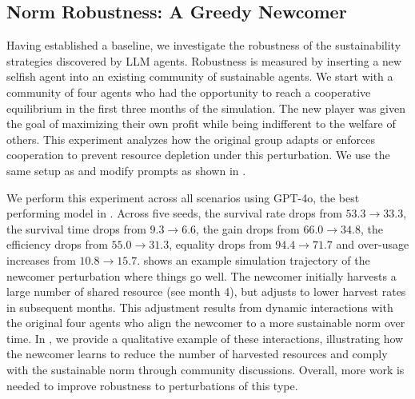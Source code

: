 \documentclass{article}
\begin{document}
\subsection{Norm Robustness: A Greedy Newcomer}
\label{p:newcomer}
Having established a baseline, we investigate the robustness of the sustainability strategies discovered by LLM agents. Robustness is measured by inserting a new selfish agent into an existing community of sustainable agents. We start with a community of four agents who had the opportunity to reach a cooperative equilibrium in the first three months of the simulation. The new player was given the goal of maximizing their own profit while being indifferent to the welfare of others. This experiment analyzes how the original group adapts or enforces cooperation to prevent resource depletion under this perturbation. We use the same setup as  and modify prompts as shown in .

We perform this experiment across all scenarios using GPT-4o, the best performing model in . Across five seeds, the survival rate drops from $53.3 \rightarrow 33.3$, the survival time drops from $9.3 \rightarrow 6.6$, the gain drops from $66.0 \rightarrow 34.8$, the efficiency drops from $55.0 \rightarrow 31.3$, equality drops from $94.4 \rightarrow 71.7$ and over-usage increases from $10.8 \rightarrow 15.7$.  shows an example simulation trajectory of the newcomer perturbation where things go well. The newcomer initially harvests a large number of shared resource (see month 4), but adjusts to lower harvest rates in subsequent months. This adjustment results from dynamic interactions with the original four agents who align the newcomer to a more sustainable norm over time. In , we provide a qualitative example of these interactions, illustrating how the newcomer learns to reduce the number of harvested resources and comply with the sustainable norm through community discussions. Overall, more work is needed to improve robustness to perturbations of this type. 
\end{document}
